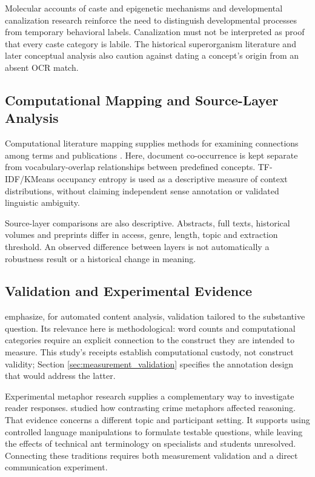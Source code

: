 \documentclass[
]{article}
\numberwithin{equation}{section}
\begin{document}
Molecular accounts of caste and epigenetic mechanisms
\citep{sumner2018molecular, oldroyd2021epigenetics} and developmental
canalization research \citep{qiu2022canalized} reinforce the need to
distinguish developmental processes from temporary behavioral labels.
Canalization must not be interpreted as proof that every caste category
is labile. The historical superorganism literature \citep{wheeler1911}
and later conceptual analysis \citep{boomsma2018superorganismality} also
caution against dating a concept's origin from an absent OCR match.

\subsection{Computational Mapping and Source-Layer
Analysis}\label{computational-mapping-and-source-layer-analysis}

Computational literature mapping supplies methods for examining
connections among terms and publications \citep{chen2006citespace}.
Here, document co-occurrence is kept separate from vocabulary-overlap
relationships between predefined concepts. TF-IDF/KMeans occupancy
entropy is used as a descriptive measure of context distributions,
without claiming independent sense annotation or validated linguistic
ambiguity.

Source-layer comparisons are also descriptive. Abstracts, full texts,
historical volumes and preprints differ in access, genre, length, topic
and extraction threshold. An observed difference between layers is not
automatically a robustness result or a historical change in meaning.

\subsection{Validation and Experimental
Evidence}\label{validation-and-experimental-evidence}

\citet{grimmer2013text} emphasize, for automated content analysis,
validation tailored to the substantive question. Its relevance here is
methodological: word counts and computational categories require an
explicit connection to the construct they are intended to measure. This
study's receipts establish computational custody, not construct
validity; Section \ref{sec:measurement_validation} specifies the
annotation design that would address the latter.

Experimental metaphor research supplies a complementary way to
investigate reader responses. \citet{thibodeau2011metaphors} studied how
contrasting crime metaphors affected reasoning. That evidence concerns a
different topic and participant setting. It supports using controlled
language manipulations to formulate testable questions, while leaving
the effects of technical ant terminology on specialists and students
unresolved. Connecting these traditions requires both measurement
validation and a direct communication experiment.
\end{document}
